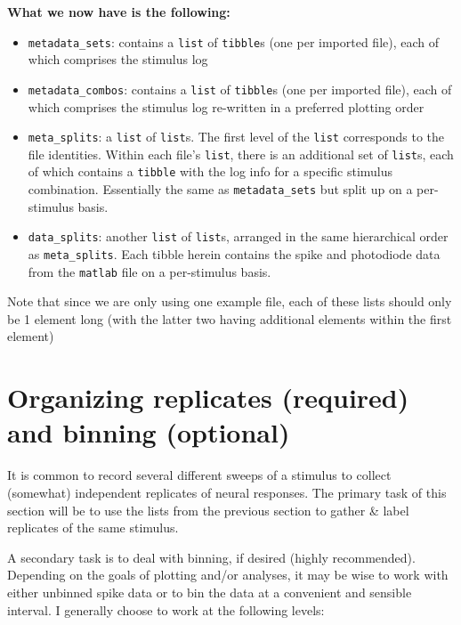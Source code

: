 \documentclass[
]{book}
\providecommand{\tightlist}{%
  \setlength{\itemsep}{0pt}\setlength{\parskip}{0pt}}
\begin{document}
\textbf{What we now have is the following:}

\begin{itemize}
\tightlist
\item
  \texttt{metadata\_sets}: contains a \texttt{list} of \texttt{tibble}s (one per imported
  file), each of which comprises the stimulus log
\item
  \texttt{metadata\_combos}: contains a \texttt{list} of \texttt{tibble}s (one per
  imported file), each of which comprises the stimulus log
  re-written in a preferred plotting order
\item
  \texttt{meta\_splits}: a \texttt{list} of \texttt{list}s. The first level of the \texttt{list}
  corresponds to the file identities. Within each file's \texttt{list},
  there is an additional set of \texttt{list}s, each of which contains a
  \texttt{tibble} with the log info for a specific stimulus combination.
  Essentially the same as \texttt{metadata\_sets} but split up on a
  per-stimulus basis.
\item
  \texttt{data\_splits}: another \texttt{list} of \texttt{list}s, arranged in the same
  hierarchical order as \texttt{meta\_splits}. Each tibble herein contains
  the spike and photodiode data from the \texttt{matlab} file on a
  per-stimulus basis.
\end{itemize}

Note that since we are only using one example file, each of these
lists should only be 1 element long (with the latter two having
additional elements within the first element)

\hypertarget{organizing-replicates-required-and-binning-optional}{%
\section{Organizing replicates (required) and binning (optional)}\label{organizing-replicates-required-and-binning-optional}}

It is common to record several different sweeps of a stimulus to
collect (somewhat) independent replicates of neural responses. The
primary task of this section will be to use the lists from the
previous section to gather \& label replicates of the same stimulus.

A secondary task is to deal with binning, if desired (highly
recommended). Depending on the goals of plotting and/or analyses, it
may be wise to work with either unbinned spike data or to bin the data
at a convenient and sensible interval. I generally choose to work at
the following levels:
\end{document}
